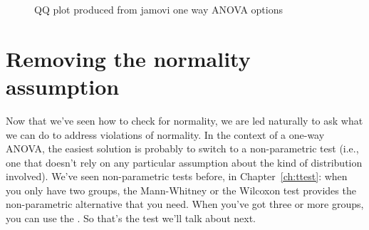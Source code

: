 \begin{figure}[h]
\begin{center}
\caption{QQ plot produced from jamovi one way ANOVA options}
\HR
\label{fig:anova5}
\end{center}
\end{figure}



\section{Removing the normality assumption~\label{sec:kruskalwallis}}

Now that we've seen how to check for normality, we are led naturally to ask what we can do to address violations of normality. In the context of a one-way ANOVA, the easiest solution is probably to switch to a non-parametric test (i.e., one that doesn't rely on any particular assumption about the kind of distribution involved). We've seen non-parametric tests before, in Chapter~\ref{ch:ttest}: when you only have two groups, the Mann-Whitney or the Wilcoxon test provides the non-parametric alternative that you need. When you've got three or more groups, you can use the  \cite{KruskalWallis1952}. So that's the test we'll talk about next.


